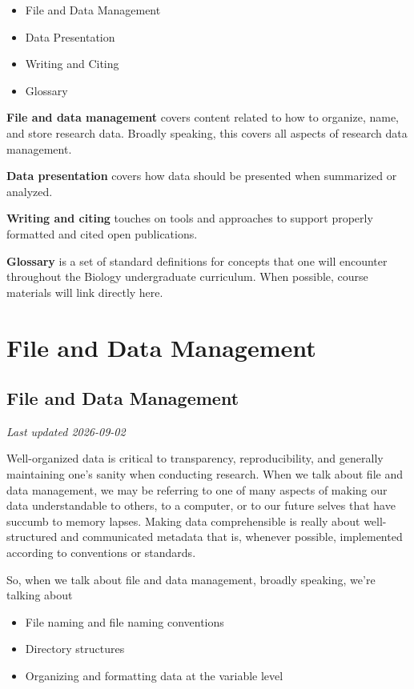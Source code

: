 \documentclass[
]{book}
\providecommand{\tightlist}{%
  \setlength{\itemsep}{0pt}\setlength{\parskip}{0pt}}
\begin{document}
\begin{itemize}
\tightlist
\item
  File and Data Management
\item
  Data Presentation
\item
  Writing and Citing
\item
  Glossary
\end{itemize}

\textbf{File and data management} covers content related to how to organize, name, and store research data. Broadly speaking, this covers all aspects of research data management.

\textbf{Data presentation} covers how data should be presented when summarized or analyzed.

\textbf{Writing and citing} touches on tools and approaches to support properly formatted and cited open publications.

\textbf{Glossary} is a set of standard definitions for concepts that one will encounter throughout the Biology undergraduate curriculum. When possible, course materials will link directly here.

\part*{File and Data Management}\label{part-file-and-data-management}

\chapter{File and Data Management}\label{file-and-data-management}

\emph{Last updated 2026-09-02}

Well-organized data is critical to transparency, reproducibility, and generally maintaining one's sanity when conducting research. When we talk about file and data management, we may be referring to one of many aspects of making our data understandable to others, to a computer, or to our future selves that have succumb to memory lapses. Making data comprehensible is really about well-structured and communicated metadata that is, whenever possible, implemented according to conventions or standards.

So, when we talk about file and data management, broadly speaking, we're talking about

\begin{itemize}
\tightlist
\item
  File naming and file naming conventions
\item
  Directory structures
\item
  Organizing and formatting data at the variable level
\end{itemize}
\end{document}
